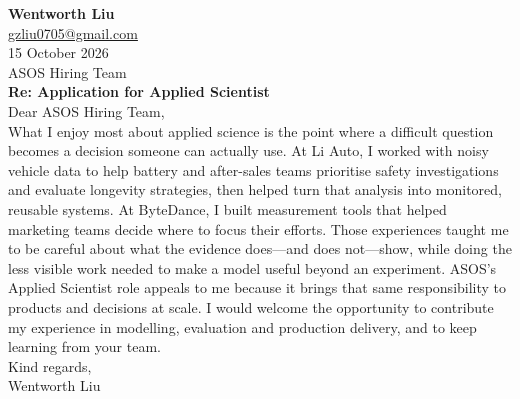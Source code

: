 \documentclass[a4paper,11pt]{article}
\begin{document}
{\large\bfseries Wentworth Liu}\\[3pt]
\href{mailto:gzliu0705@gmail.com}{gzliu0705@gmail.com}\\[16pt]
15 October 2026\\[14pt]
ASOS Hiring Team\\[14pt]
\textbf{Re: Application for Applied Scientist}\\[18pt]

Dear ASOS Hiring Team,\\[12pt]

What I enjoy most about applied science is the point where a difficult question becomes a decision someone can actually use. At Li Auto, I worked with noisy vehicle data to help battery and after-sales teams prioritise safety investigations and evaluate longevity strategies, then helped turn that analysis into monitored, reusable systems. At ByteDance, I built measurement tools that helped marketing teams decide where to focus their efforts. Those experiences taught me to be careful about what the evidence does---and does not---show, while doing the less visible work needed to make a model useful beyond an experiment. ASOS's Applied Scientist role appeals to me because it brings that same responsibility to products and decisions at scale. I would welcome the opportunity to contribute my experience in modelling, evaluation and production delivery, and to keep learning from your team.\\[22pt]

Kind regards,\\[16pt]
Wentworth Liu
\end{document}
